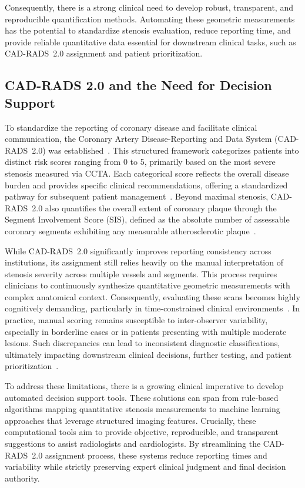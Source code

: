 Consequently, there is a strong clinical need to develop robust, transparent, and reproducible quantification methods. Automating these geometric measurements has the potential to standardize stenosis evaluation, reduce reporting time, and provide reliable quantitative data essential for downstream clinical tasks, such as CAD-RADS~2.0 assignment and patient prioritization.

\subsection{CAD-RADS 2.0 and the Need for Decision Support}
\label{subsec:cad-rads}

To standardize the reporting of coronary disease and facilitate clinical communication, the Coronary Artery Disease-Reporting and Data System (CAD-RADS~2.0) was established~\cite{cury2022}. This structured framework categorizes patients into distinct risk scores ranging from 0 to 5, primarily based on the most severe stenosis measured via CCTA. Each categorical score reflects the overall disease burden and provides specific clinical recommendations, offering a standardized pathway for subsequent patient management~\cite{cury2022}. Beyond maximal stenosis, CAD-RADS~2.0 also quantifies the overall extent of coronary plaque through the Segment Involvement Score (SIS), defined as the absolute number of assessable coronary segments exhibiting any measurable atherosclerotic plaque~\cite{cury2022}.

While CAD-RADS~2.0 significantly improves reporting consistency across institutions, its assignment still relies heavily on the manual interpretation of stenosis severity across multiple vessels and segments. This process requires clinicians to continuously synthesize quantitative geometric measurements with complex anatomical context. Consequently, evaluating these scans becomes highly cognitively demanding, particularly in time-constrained clinical environments~\cite{acebes2024}. In practice, manual scoring remains susceptible to inter-observer variability, especially in borderline cases or in patients presenting with multiple moderate lesions. Such discrepancies can lead to inconsistent diagnostic classifications, ultimately impacting downstream clinical decisions, further testing, and patient prioritization~\cite{acebes2024,hideo_kajita2019}.

To address these limitations, there is a growing clinical imperative to develop automated decision support tools. These solutions can span from rule-based algorithms mapping quantitative stenosis measurements to machine learning approaches that leverage structured imaging features. Crucially, these computational tools aim to provide objective, reproducible, and transparent suggestions to assist radiologists and cardiologists. By streamlining the CAD-RADS~2.0 assignment process, these systems reduce reporting times and variability while strictly preserving expert clinical judgment and final decision authority.

